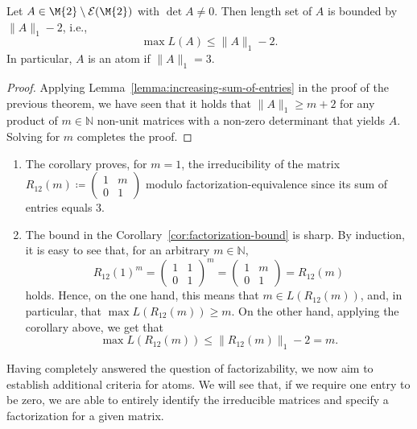 \begin{corollary}\label{cor:factorization-bound}
Let $A \in \M{2}\setminus\mathcal{E}(\M{2})$ with $\det{A} \neq 0$. Then length set of $A$ is bounded by $\| A \|_1 -2$, i.e., 
\[ \max L(A) \leq \| A \|_1 -2.\]
In particular, $A$ is an atom if $\| A \|_1 = 3$.
\end{corollary}

\begin{proof}
Applying Lemma~\ref{lemma:increasing-sum-of-entries} in the proof of the previous theorem, we have seen that it holds that $\|A \|_1 \geq m +2$ for any product of $m \in \mathbb{N}$ non-unit matrices with a non-zero determinant that yields $A$. Solving for $m$ completes the proof.
\end{proof}

\begin{remark*}
\mbox{}\vspace{-2\topskip}
\begin{enumerate}[label=(\alph*)]
\item The corollary proves, for $m=1$, the irreducibility of the matrix $R_{12}(m) \coloneqq \begin{pmatrix} 1 & m \\ 0 & 1 \end{pmatrix}$ modulo factorization-equivalence since its sum of entries equals $3$.
\item The bound in the Corollary~\ref{cor:factorization-bound} is sharp. By induction, it is easy to see that, for an arbitrary $m \in \mathbb{N}$, 
\[ R_{12}(1)^m = \begin{pmatrix} 1 & 1 \\ 0 & 1 \end{pmatrix}^m=\begin{pmatrix} 1 & m \\ 0 & 1 \end{pmatrix}=R_{12}(m)\]
holds. Hence, on the one hand, this means that $m \in L(R_{12}(m))$, and, in particular, that $\max L(R_{12}(m)) \geq m$. On the other hand, applying the corollary above, we get that 
\[ \max L(R_{12}(m)) \leq \| R_{12}(m) \|_1 -2 = m.\]
\end{enumerate}
\end{remark*}

Having completely answered the question of factorizability, we now aim to establish additional criteria for atoms. We will see that, if we require one entry to be zero, we are able to entirely identify the irreducible matrices and specify a factorization for a given matrix.

